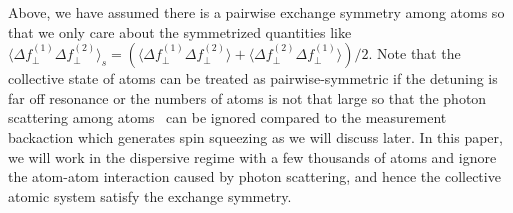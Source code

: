 \documentclass[preprint,aps,pra,onecolumn,superscriptaddress]{revtex4-1} %
\newcommand{\expect}[1]{\big\langle #1 \big\rangle}
\begin{document}
Above, we have assumed there is a pairwise exchange symmetry among atoms so that we only care about the symmetrized quantities like $ \expect{\Delta f_\perp^{(1)}\Delta f_\perp^{(2)}}_s=\left(\expect{\Delta f_\perp^{(1)}\Delta f_\perp^{(2)}} + \expect{\Delta f_\perp^{(2)}\Delta f_\perp^{(1)}} \right)/2 $. 
Note that the collective state of atoms can be treated as pairwise-symmetric if the detuning is far off resonance or the numbers of atoms is not that large so that the photon scattering among atoms~\cite{Asenjo-Garcia2017Atom,Asenjo-Garcia2017Exponential} can be ignored compared to the measurement backaction which generates spin squeezing as we will discuss later.
In this paper, we will work in the dispersive regime with a few thousands of atoms and ignore the atom-atom interaction caused by photon scattering, and hence the collective atomic system satisfy the exchange symmetry. 
\end{document}
